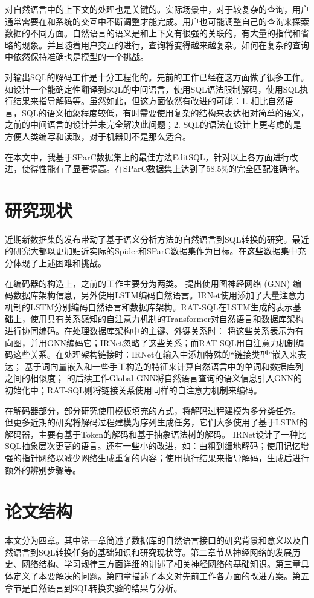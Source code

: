 对自然语言中的上下文的处理也是关键的。实际场景中，对于较复杂的查询，用户通常需要在和系统的交互中不断调整才能完成。用户也可能调整自己的查询来探索数据的不同方面。自然语言的语义是和上下文有很强的关联的，有大量的指代和省略的现象。并且随着用户交互的进行，查询将变得越来越复杂。如何在复杂的查询中依然保持准确也是模型的一个挑战。

对输出SQL的解码工作是十分工程化的。先前的工作已经在这方面做了很多工作。如设计一个能确定性翻译到SQL的中间语言，使用SQL语法限制解码，使用SQL执行结果来指导解码等。虽然如此，但这方面依然有改进的可能：1. 相比自然语言，SQL的语义抽象程度较低，有时需要使用复杂的结构来表达相对简单的语义，之前的中间语言的设计并未完全解决此问题；2. SQL的语法在设计上更考虑的是方便人类编写和读取，对于机器则不是那么适合。

在本文中，我基于SParC数据集上的最佳方法EditSQL\cite{edit19}，针对以上各方面进行改进，使得性能有了显著提高。在SParC数据集上达到了58.5\%的完全匹配准确率。

\section{研究现状}

近期新数据集的发布带动了基于语义分析方法的自然语言到SQL转换的研究。最近的研究大都以更加贴近实际的Spider和SParC数据集作为目标。在这些数据集中充分体现了上述困难和挑战。

在编码器的构造上，之前的工作主要分为两类。 \citet{gnn19}提出使用图神经网络 (GNN) 编码数据库架构信息，另外使用LSTM\cite{lstm97}编码自然语言。IRNet\cite{irnet19}使用添加了大量注意力机制的LSTM分别编码自然语言和数据库架构。RAT-SQL\cite{ratsql19}在LSTM生成的表示基础上，使用具有关系感知的自注意力机制的Transformer\cite{attn17}对自然语言和数据库架构进行协同编码。在处理数据库架构中的主键、外键关系时： \citet{gnn19}将这些关系表示为有向图，并用GNN编码它；IRNet忽略了这些关系；而RAT-SQL用自注意力机制编码这些关系。在处理架构链接时：IRNet在输入中添加特殊的“链接类型”嵌入来表达； \citet{gnn19}基于词向量嵌入和一些手工构造的特征来计算自然语言中的单词和数据库列之间的相似度； \citet{gnn19}的后续工作Global-GNN\cite{ggcn19}将自然语言查询的语义信息引入GNN的初始化中；RAT-SQL则将链接关系使用同样的自注意力机制来编码。

在解码器部分，部分研究使用模板填充的方式，将解码过程建模为多分类任务\cite{cao19,seq2sql17,sqlnet17}。
但更多近期的研究将解码过程建模为序列生成任务，它们大多使用了基于LSTM的解码器，主要有基于Token的解码\cite{edit19}和基于抽象语法树的解码\cite{irnet19,gnn19,ggcn19,syntaxsqlnet18}。
IRNet设计了一种比SQL抽象层次更高的语言。还有一些小的改进，如：由粗到细地解码\cite{irnet19,coarse-to-fine18}；使用记忆增强的指针网络以减少网络生成重复的内容；使用执行结果来指导解码\cite{wang2018execution-guided}，生成后进行额外的辨别步骤等\cite{ggcn19}。

\section{论文结构}

本文分为四章。其中第一章简述了数据库的自然语言接口的研究背景和意义以及自然语言到SQL转换任务的基础知识和研究现状等。第二章节从神经网络的发展历史、网络结构、学习规律三方面详细的讲述了相关神经网络的基础知识。第三章具体定义了本要解决的问题。第四章描述了本文对先前工作各方面的改进方案。第五章节是自然语言到SQL转换实验的结果与分析。
